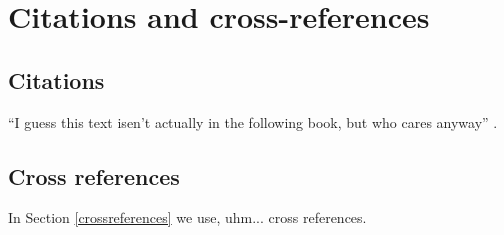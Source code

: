 \chapter{Citations and cross-references}

\section{Citations}
``I guess this text isen't actually in the following book, but who
cares anyway'' \cite{proakis96}.

\section{Cross references \label{crossreferences}}

In Section \ref{crossreferences} we use, uhm...  cross references.
